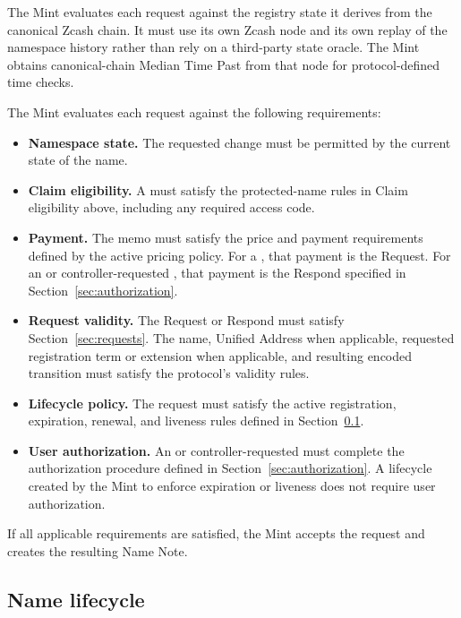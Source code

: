 The Mint evaluates each request against the registry state it derives from the canonical Zcash chain. It must use its own Zcash node and its own replay of the namespace history rather than rely on a third-party state oracle. The Mint obtains canonical-chain Median Time Past from that node for protocol-defined time checks.

The Mint evaluates each request against the following requirements:

\begin{itemize}
  \item \textbf{Namespace state.} The requested change must be permitted by the current state of the name.
  \item \textbf{Claim eligibility.} A  must satisfy the protected-name rules in Claim eligibility above, including any required access code.
  \item \textbf{Payment.} The memo must satisfy the price and payment requirements defined by the active pricing policy. For a , that payment is the Request. For an  or controller-requested , that payment is the Respond specified in Section~\ref{sec:authorization}.
  \item \textbf{Request validity.} The Request or Respond must satisfy Section~\ref{sec:requests}. The name, Unified Address when applicable, requested registration term or extension when applicable, and resulting encoded transition must satisfy the protocol's validity rules.
  \item \textbf{Lifecycle policy.} The request must satisfy the active registration, expiration, renewal, and liveness rules defined in Section~\ref{sec:the-mint-lifecycle}.
  \item \textbf{User authorization.} An  or controller-requested  must complete the authorization procedure defined in Section~\ref{sec:authorization}. A lifecycle  created by the Mint to enforce expiration or liveness does not require user authorization.
\end{itemize}

If all applicable requirements are satisfied, the Mint accepts the request and creates the resulting Name Note.

\subsection{Name lifecycle}
\label{sec:the-mint-lifecycle}

